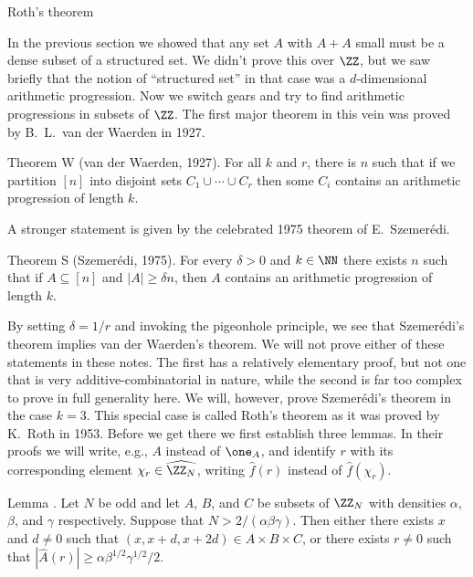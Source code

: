 \advsect Roth's theorem

In the previous section we showed that any set $A$ with $A+A$ small
must be a dense subset of a structured set. We didn't prove this over $\ZZ$, but we saw briefly that
the notion of ``structured set'' in that case was a $d$-dimensional arithmetic progression. Now we switch
gears and try to find arithmetic progressions in subsets of $\ZZ$. The first major theorem in this vein was
proved by B.~L.~van der Waerden in 1927.

\parenproclaim Theorem W (van der Waerden, {\rm 1927}). For all $k$ and $r$, there is $n$ such
that if we partition $[n]$ into disjoint sets $C_1\cup \cdots \cup C_r$ then some $C_i$ contains an
arithmetic progression of length $k$.\slug

A stronger statement is given by the celebrated 1975 theorem of E.~Szemer\'edi.

\parenproclaim Theorem S (Szemer\'edi, {\rm 1975}). For every $\delta>0$ and $k\in \NN$ there
exists $n$ such that if $A\subseteq [n]$ and $|A|\ge \delta n$, then $A$ contains an arithmetic progression
of length $k$.\slug

By setting $\delta = 1/r$ and invoking the pigeonhole principle, we see that
Szemer\'edi's theorem implies van der Waerden's theorem. We will not prove either of these statements in
these notes. The first has a relatively elementary proof, but not one that is very additive-combinatorial
in nature, while the second is far too complex to prove in full generality here. We will, however,
prove Szemer\'edi's theorem in the case $k=3$. This special case is called Roth's theorem as it was
proved by K.~Roth in 1953.
Before we get there we first establish three lemmas. In their proofs we will write, e.g., $A$ instead
of $\one_A$, and identify
$r$ with its corresponding element $\chi_r\in \hat{\ZZ_N}$, writing $\hat f(r)$ instead of $\hat f(\chi_r)$.

\edef\lemABC{\the\thmcount}
\proclaim Lemma {\advthm}. Let $N$ be odd and let $A$, $B$, and $C$ be subsets of $\ZZ_N$ with densities
$\alpha$, $\beta$, and $\gamma$ respectively. Suppose that $N > 2/(\alpha\beta\gamma)$. Then either
there exists $x$ and $d\ne 0$ such that $(x,x+d,x+2d)\in A\times B\times C$, or there exists $r\ne 0$
such that $|\hat A(r)| \ge \alpha \beta^{1/2} \gamma^{1/2} / 2$.

